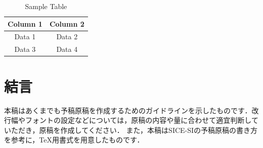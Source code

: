 \documentclass{sice-si}
\begin{document}
\begin{table}[tb]
    \centering
    \caption{Sample Table}
    \label{tab:sample}
    \begin{tabular}{c|c}
        Column 1 & Column 2 \\
        \hline
        \hline
        Data 1   & Data 2   \\
        \hline
        Data 3   & Data 4   \\
    \end{tabular}
\end{table}


\section{結言}
本稿はあくまでも予稿原稿を作成するためのガイドラインを示したものです．改行幅やフォントの設定などについては，原稿の内容や量に合わせて適宜判断していただき，原稿を作成してください．
また，本稿はSICE-SIの予稿原稿の書き方 \cite{cite:SI,cite:SIbook,cite:SIproc,cite:WebPage}を参考に，\TeX 用書式を用意したものです．



\printbibliography[title=参考文献]
\end{document}
